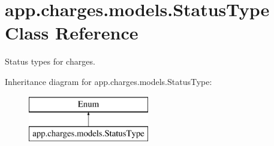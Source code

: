 \hypertarget{classapp_1_1charges_1_1models_1_1_status_type}{}\section{app.\+charges.\+models.\+Status\+Type Class Reference}
\label{classapp_1_1charges_1_1models_1_1_status_type}


Status types for charges.  


Inheritance diagram for app.\+charges.\+models.\+Status\+Type\+:\begin{figure}[H]
\begin{center}
\leavevmode
\includegraphics[height=2.000000cm]{classapp_1_1charges_1_1models_1_1_status_type}
\end{center}
\end{figure}
